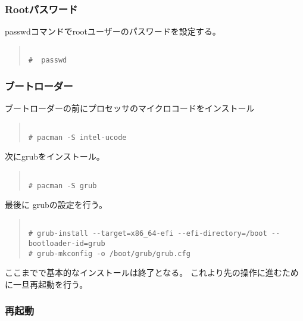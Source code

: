 \documentclass[dvipdfmx]{jsarticle}
\begin{document}
\subsubsection{Rootパスワード}

passwdコマンドでrootユーザーのパスワードを設定する。

\begin{quote}
\begin{verbatim}

#  passwd 

\end{verbatim}
\end{quote}


\subsubsection{ブートローダー}

ブートローダーの前にプロセッサのマイクロコードをインストール

\begin{quote}
\begin{verbatim}

# pacman -S intel-ucode 

\end{verbatim}
\end{quote}

次にgrubをインストール。

\begin{quote}
\begin{verbatim}

# pacman -S grub

\end{verbatim}
\end{quote}

最後に grubの設定を行う。

\begin{quote}
\begin{verbatim}

# grub-install --target=x86_64-efi --efi-directory=/boot --bootloader-id=grub
# grub-mkconfig -o /boot/grub/grub.cfg

\end{verbatim}
\end{quote}

ここまでで基本的なインストールは終了となる。
これより先の操作に進むために一旦再起動を行う。

\subsubsection{再起動}
\end{document}
